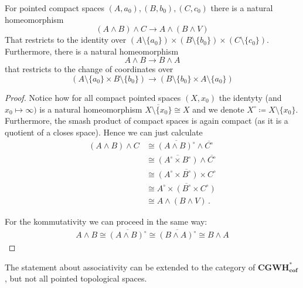 \begin{lemma}\label{lem:kTheo-SmaschIsAssociative}
	For pointed compact spaces $(A,a_0),(B,b_0),(C,c_0)$ there is a natural homeomorphism
	\begin{equation*}
		(A\wedge B) \wedge C \to A\wedge (B\wedge V)
	\end{equation*}That restricts to the identity over $(A\setminus \{a_0\})\times( B\setminus \{b_0\}) \times (C\setminus \{c_0\})$.
	Furthermore, there is a natural homeomorphism
	\begin{equation*}
		A\wedge B\to B\wedge A
	\end{equation*}that restricts to the change of coordinates over 
	\begin{equation*}
		(A\setminus \{a_0\}\times B\setminus\{b_0\})\to (B\setminus \{b_0\}\times A\setminus\{a_0\})
	\end{equation*}

\end{lemma}
\begin{proof}
	Notice how for all compact pointed spaces $(X,x_0)$ the identyty (and $x_0\mapsto \infty)$ is a natural homeomorphism $\overline{X\setminus \{x_0\}}\cong X$ and we denote $X^\circ \coloneq X\setminus \{x_0\}$. Furthermore, the smash product of compact spaces is again compact (as it is a quotient of a closes space). Hence we can just calculate
	\begin{align*}
		(A\wedge B) \wedge C 
		& \cong \overline{(A\wedge B)^\circ} \wedge \overline{C^\circ}\\
				& \cong \overline{(A^\circ\times B^\circ)} \wedge \overline{C^\circ}\\
		& \cong \overline{(A^\circ \times B^\circ) \times C^\circ} \\
		& \cong \overline{A^\circ \times( B^\circ \times C^\circ)} \\
		& \cong A\wedge (B\wedge V)\,.
	\end{align*} 

		For the kommutativity we can proceed in the same way:
	\begin{align}
		A\wedge B \cong \overline{(A\wedge B)^{\circ}}\cong \overline{(B\wedge A)^{\circ}}\cong B \wedge A
	\end{align}
\end{proof}
\begin{remark}
	The statement about associativity can be extended to the category of $\mathbf{CGWH}^*_{\mathbf{cof}}$, but not all pointed topological spaces. 
\end{remark}

